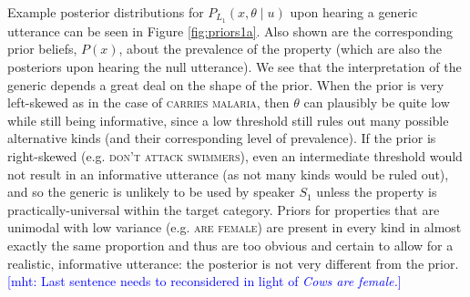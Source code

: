 \documentclass[10pt,letterpaper]{article}
\newcommand{\mht}[1]{\textcolor{Blue}{[mht: #1]}}
\begin{document}
Example posterior distributions for $P_{L_{1}}(x , \theta \mid u)$ upon hearing a generic utterance can be seen in Figure \ref{fig:priors1a}. 
Also shown are the corresponding prior beliefs, $P(x)$, about the prevalence of the property (which are also the posteriors upon hearing the null utterance).
We see that the interpretation of the generic depends a great deal on the shape of the prior.
When the prior is very left-skewed as in the case of \textsc{carries malaria}, then $\theta$ can plausibly be quite low while still being informative, since a low threshold still rules out many possible alternative kinds (and their corresponding level of prevalence).
If the prior is right-skewed (e.g. \textsc{don't attack swimmers}), even an intermediate threshold would not result in an informative utterance (as not many kinds would be ruled out), and so the generic is unlikely to be used by speaker $S_1$ unless the property is practically-universal within the target category. 
Priors for properties that are unimodal with low variance (e.g. \textsc{are female}) are present in every kind in almost exactly the same proportion and thus are too obvious and certain to allow for a realistic, informative utterance: the posterior is not very different from the prior. 
\mht{Last sentence needs to reconsidered in light of \emph{Cows are female.}}


\end{document}
